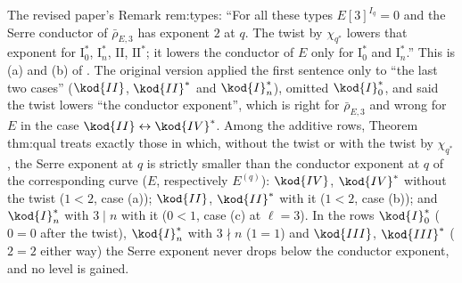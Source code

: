 \begin{paperlink}
The revised paper's Remark rem:types: ``For all these types $E[3]^{I_q}=0$ and the Serre conductor of $\bar\rho_{E,3}$ has exponent $2$ at $q$. The
twist by $\chi_{q^*}$ lowers that exponent for $\mathrm{I}_0^*$, $\mathrm{I}_n^*$, $\mathrm{II}$, $\mathrm{II}^*$; it lowers the conductor of $E$
only for $\mathrm{I}_0^*$ and $\mathrm{I}_n^*$.'' This is (a) and (b) of . The original version applied the first
sentence only to ``the last two cases'' ($\kod{II}$, $\kod{II}^*$ and $\kod{I}_n^*$), omitted $\kod{I}_0^*$, and said the twist lowers ``the conductor exponent'', which
is right for $\bar\rho_{E,3}$ and wrong for $E$ in the case $\kod{II}\leftrightarrow\kod{IV}^*$. Among the additive rows, Theorem thm:qual treats exactly those in
which, without the twist or with the twist by $\chi_{q^*}$, the Serre exponent at $q$ is strictly smaller than the conductor exponent at $q$ of the
corresponding curve ($E$, respectively $E^{(q)}$): $\kod{IV}$, $\kod{IV}^*$ without the twist ($1<2$, case (a)); $\kod{II}$, $\kod{II}^*$ with it ($1<2$, case
(b)); and $\kod{I}_n^*$ with $3\mid n$ with it ($0<1$, case (c) at $\ell=3$). In the rows $\kod{I}_0^*$ ($0=0$ after the twist), $\kod{I}_n^*$ with $3\nmid n$ ($1=1$)
and $\kod{III}$, $\kod{III}^*$ ($2=2$ either way) the Serre exponent never drops below the conductor exponent, and no level is gained.
\end{paperlink}

